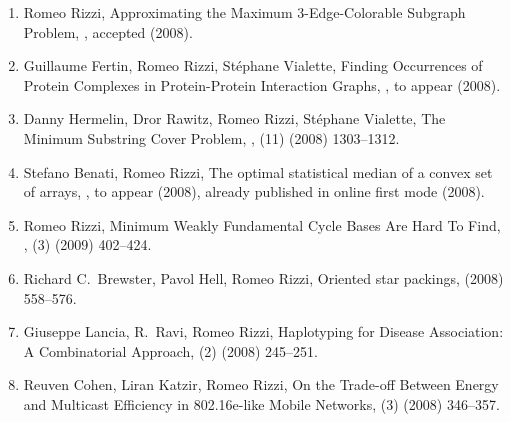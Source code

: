 \documentclass[11pt]{article}
\begin{document}
\begin{enumerate}
\vspace{-3.0mm}

 \vspace{1.2mm}
  \item {\sc Romeo Rizzi},
   \newblock   Approximating the Maximum $3$-Edge-Colorable Subgraph Problem,
   ,
             accepted (2008).

  \item {\sc Guillaume Fertin, Romeo Rizzi, St\'ephane Vialette},
   \newblock  Finding Occurrences of Protein
              Complexes in Protein-Protein Interaction Graphs,
   ,
             to appear (2008).

  \item {\sc Danny Hermelin, Dror Rawitz, Romeo Rizzi, St\'ephane Vialette},
   \newblock  The Minimum Substring Cover Problem,
   ,
   (11) (2008) 1303--1312.

  \item {\sc Stefano Benati, Romeo Rizzi},
   \newblock   The optimal statistical median of a convex set of arrays,
   ,
             to appear (2008),
             already published in online first mode (2008).

  \item {\sc Romeo Rizzi},
   \newblock   Minimum Weakly Fundamental Cycle Bases Are Hard To Find,
   ,
   (3) (2009) 402--424.

  \item {\sc Richard C.~Brewster, Pavol Hell, Romeo Rizzi},
   \newblock  Oriented star packings,
    (2008) 558--576.

  \item {\sc Giuseppe Lancia, R.~Ravi, Romeo Rizzi},
   \newblock  Haplotyping for Disease Association: A Combinatorial Approach, 
   (2) (2008) 245--251.

  \item {\sc Reuven Cohen, Liran Katzir, Romeo Rizzi},
   \newblock   On the Trade-off Between Energy and Multicast Efficiency in 802.16e-like Mobile Networks,
   (3) (2008) 346--357.


\end{enumerate}
\end{document}
